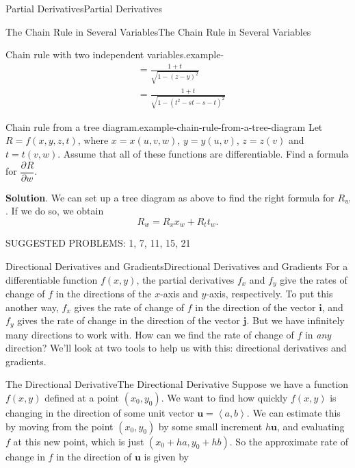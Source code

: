 \documentclass[10pt,]{book}
\numberwithin{equation}{section}
\newcommand{\vv}[1]{\mathbf{#1}}
\newcommand{\pdv}[3][]{\dfrac{\partial^{#1} #2}{\partial #3^{#1}}}
\newcommand{\dotprod}[1]{\left\langle #1 \right\rangle}
\begin{document}
\begin{chapterptx}{Partial Derivatives}{}{Partial Derivatives}{}{}
\begin{sectionptx}{The Chain Rule in Several Variables}{}{The Chain Rule in Several Variables}{}{}
\begin{example}{Chain rule with two independent variables.}{example-}
\begin{align*}
& = \frac{1 + t}{\sqrt{1 - (z - y)^{2}}} \\
& = \frac{1 + t}{\sqrt{1 - (t^{2} - st - s - t)^{2}}} 
\end{align*}
%
\end{example}
\begin{example}{Chain rule from a tree diagram.}{example-chain-rule-from-a-tree-diagram}%
\hypertarget{p-1175}{}%
Let \(R = f(x,y,z,t)\), where \(x = x(u,v,w)\), \(y = y(u, v)\), \(z = z(v)\) and \(t = t(v,w)\). Assume that all of these functions are differentiable. Find a formula for \(\pdv{R}{w}.\)%
\par\smallskip%
\noindent\textbf{Solution}.\hypertarget{solution-184}{}\quad%
\hypertarget{p-1176}{}%
We can set up a tree diagram as above to find the right formula for \(R_{w}\). If we do so, we obtain%
\begin{equation*}
R_{w} = R_{x}x_{w} + R_{t}t_{w}.
\end{equation*}
%
\end{example}
\hypertarget{p-1177}{}%
SUGGESTED PROBLEMS: 1, 7, 11, 15, 21%
\end{sectionptx}
%
%
\typeout{************************************************}
\typeout{************************************************}
%
\begin{sectionptx}{Directional Derivatives and Gradients}{}{Directional Derivatives and Gradients}{}{}\label{section-directional-derivatives-and-gradients}
\hypertarget{p-1178}{}%
For a differentiable function \(f(x,y)\), the partial derivatives \(f_{x}\) and \(f_{y}\) give the rates of change of \(f\) in the directions of the \(x\)-axis and \(y\)-axis, respectively. To put this another way, \(f_{x}\) gives the rate of change of \(f\) in the direction of the vector \(\vv{i}\), and \(f_{y}\) gives the rate of change in the direction of the vector \(\vv{j}\). But we have infinitely many directions to work with. How can we find the rate of change of \(f\) in \emph{any} direction? We'll look at two tools to help us with this: directional derivatives and gradients.%
%
%
\typeout{************************************************}
\typeout{************************************************}
%
\begin{subsectionptx}{The Directional Derivative}{}{The Directional Derivative}{}{}\label{subsection-the-directional-derivative}
\hypertarget{p-1179}{}%
Suppose we have a function \(f(x,y)\) defined at a point \((x_{0},y_{0})\). We want to find how quickly \(f(x,y)\) is changing in the direction of some unit vector \(\vv{u} = \dotprod{a,b}\). We can estimate this by moving from the point \((x_{0},y_{0})\) by some small increment \(h\vv{u}\), and evaluating \(f\) at this new point, which is just \((x_{0} + ha, y_{0} + hb)\). So the approximate rate of change in \(f\) in the direction of \(\vv{u}\) is given by%

\end{subsectionptx}
\end{sectionptx}
\end{chapterptx}
\end{document}

